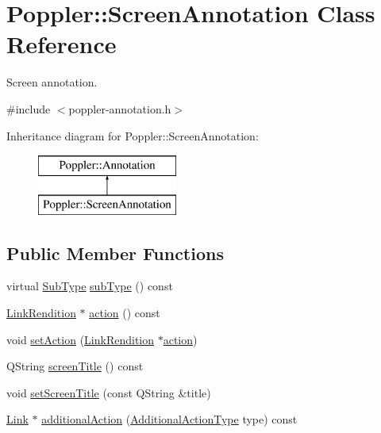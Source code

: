 \hypertarget{class_poppler_1_1_screen_annotation}{}\section{Poppler\+:\+:Screen\+Annotation Class Reference}
\label{class_poppler_1_1_screen_annotation}


Screen annotation.  




{\ttfamily \#include $<$poppler-\/annotation.\+h$>$}

Inheritance diagram for Poppler\+:\+:Screen\+Annotation\+:\begin{figure}[H]
\begin{center}
\leavevmode
\includegraphics[height=2.000000cm]{class_poppler_1_1_screen_annotation}
\end{center}
\end{figure}
\subsection*{Public Member Functions}
\begin{DoxyCompactItemize}
\item 
virtual \hyperlink{class_poppler_1_1_annotation_a2d592999c330949d64679cfa9e81113f}{Sub\+Type} \hyperlink{class_poppler_1_1_screen_annotation_a7a8076dfda640ecf040db9acdd8b3ecf}{sub\+Type} () const
\item 
\hyperlink{class_poppler_1_1_link_rendition}{Link\+Rendition} $\ast$ \hyperlink{class_poppler_1_1_screen_annotation_a01cae5bce049e1a6c3956ca53491832c}{action} () const
\item 
void \hyperlink{class_poppler_1_1_screen_annotation_a1df5efe49b6f8f5333324cbef856519f}{set\+Action} (\hyperlink{class_poppler_1_1_link_rendition}{Link\+Rendition} $\ast$\hyperlink{class_poppler_1_1_screen_annotation_a01cae5bce049e1a6c3956ca53491832c}{action})
\item 
Q\+String \hyperlink{class_poppler_1_1_screen_annotation_aefb1b8c92fa3c3ca3b2975282fd7cefa}{screen\+Title} () const
\item 
void \hyperlink{class_poppler_1_1_screen_annotation_aa9169592f12287f9c7242bef0d31ae87}{set\+Screen\+Title} (const Q\+String \&title)
\item 
\hyperlink{class_poppler_1_1_link}{Link} $\ast$ \hyperlink{class_poppler_1_1_screen_annotation_a55123502cb0672be387a6abeddf10b55}{additional\+Action} (\hyperlink{class_poppler_1_1_annotation_adab1fa85588b8f9fcdf20cdf37c1be97}{Additional\+Action\+Type} type) const
\end{DoxyCompactItemize}
